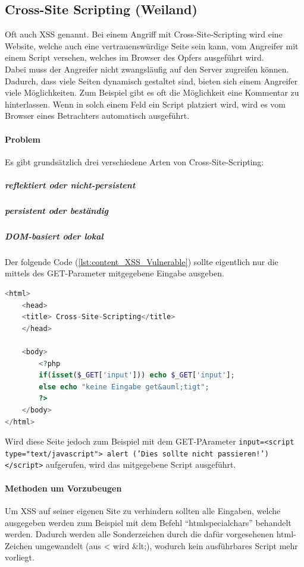 \subsection{Cross-Site Scripting (Weiland)}
Oft auch XSS genannt. Bei einem Angriff mit Cross-Site-Scripting wird eine Website, welche auch eine vertrauenswürdige Seite sein kann, vom Angreifer mit einem Script versehen, welches im Browser des Opfers ausgeführt wird.\\
Dabei muss der Angreifer nicht zwangsläufig auf den Server zugreifen können. Dadurch, dass viele Seiten dynamisch gestaltet sind, bieten sich einem Angreifer viele Möglichkeiten. Zum Beispiel gibt es oft die Möglichkeit eine Kommentar zu hinterlassen. Wenn in solch einem Feld ein Script platziert wird, wird es vom Browser eines Betrachters automatisch ausgeführt.
\paragraph{Problem}
Es gibt grundsätzlich drei verschiedene Arten von Cross-Site-Scripting:
\subparagraph{reflektiert oder nicht-persistent}
\subparagraph{persistent oder beständig}
\subparagraph{DOM-basiert oder lokal}
Der folgende Code (\autoref{lst:content_XSS_Vulnerable}) sollte eigentlich nur die mittels des GET-Parameter mitgegebene Eingabe ausgeben.
\begin{lstlisting}[style=custom, language=PHP, caption={Cross-Site-Scripting Anfällig},label={lst:content_XSS_Vulnerable}]
<html>
	<head>
	<title> Cross-Site-Scripting</title>
	</head>

	<body>
		<?php
		if(isset($_GET['input'])) echo $_GET['input'];
		else echo "keine Eingabe get&auml;tigt";			
		?>
	</body>
</html>
\end{lstlisting}

Wird diese Seite jedoch zum Beispiel mit dem GET-PArameter \texttt{input=<script type="text/javascript"> alert ('Dies sollte nicht passieren!') </script>} aufgerufen, wird das mitgegebene Script ausgeführt.


\paragraph{Methoden um Vorzubeugen}

Um XSS auf seiner eigenen Site zu verhindern sollten alle Eingaben, welche ausgegeben werden zum Beispiel mit dem Befehl \enquote{htmlspecialchars} behandelt werden. Dadurch werden alle Sonderzeichen durch die dafür vorgesehenen html-Zeichen umgewandelt (aus < wird \&lt;), wodurch kein ausführbares Script mehr vorliegt.

